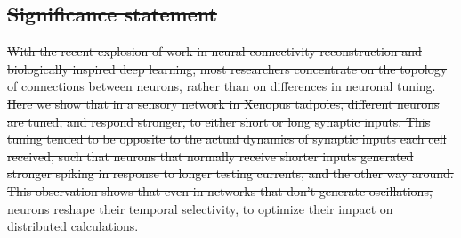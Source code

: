 \documentclass{article}
\providecommand{\DIFdeltex}[1]{{\protect\color{red}\sout{#1}}}                      %
\providecommand{\DIFaddbegin}{} %
\providecommand{\DIFaddend}{} %
\providecommand{\DIFdelbegin}{} %
\providecommand{\DIFdelend}{} %
\providecommand{\DIFdel}[1]{\texorpdfstring{\DIFdeltex{#1}}{}} %
\newcommand{\DIFscaledelfig}{0.5}
\newlength{\DIFdelgraphicswidth} %
\newlength{\DIFdelgraphicsheight} %
\newcommand{\DIFaddincludegraphics}[2][]{{\color{blue}\fbox{\DIFOincludegraphics[#1]{#2}}}} %
\newcommand{\DIFdelincludegraphics}[2][]{%
\sbox{\DIFdelgraphicsbox}{\DIFOincludegraphics[#1]{#2}}%
\settoboxwidth{\DIFdelgraphicswidth}{\DIFdelgraphicsbox} %
\settoboxtotalheight{\DIFdelgraphicsheight}{\DIFdelgraphicsbox} %
\scalebox{\DIFscaledelfig}{%
\parbox[b]{\DIFdelgraphicswidth}{\usebox{\DIFdelgraphicsbox}\\[-\baselineskip] \rule{\DIFdelgraphicswidth}{0em}}\llap{\resizebox{\DIFdelgraphicswidth}{\DIFdelgraphicsheight}{%
\setlength{\unitlength}{\DIFdelgraphicswidth}%
\begin{picture}(1,1)%
\thicklines\linethickness{2pt} %
{\color[rgb]{1,0,0}\put(0,0){\framebox(1,1){}}}%
{\color[rgb]{1,0,0}\put(0,0){\line( 1,1){1}}}%
{\color[rgb]{1,0,0}\put(0,1){\line(1,-1){1}}}%
\end{picture}%
}\hspace*{3pt}}} %
} %
\DeclareRobustCommand{\DIFaddbegin}{\DIFOaddbegin \let\includegraphics\DIFaddincludegraphics} %
\DeclareRobustCommand{\DIFaddend}{\DIFOaddend \let\includegraphics\DIFOincludegraphics} %
\DeclareRobustCommand{\DIFdelbegin}{\DIFOdelbegin \let\includegraphics\DIFdelincludegraphics} %
\DeclareRobustCommand{\DIFdelend}{\DIFOaddend \let\includegraphics\DIFOincludegraphics} %
\begin{document}
\begin{flushleft}
\DIFaddbegin 

\DIFaddend %


\DIFdelbegin \section*{\DIFdel{Significance statement}}
\DIFdel{With the recent explosion of work in neural connectivity reconstruction and biologically inspired deep learning, most researchers concentrate on the topology of connections between neurons, rather than on differences in neuronal tuning. Here we show that in a sensory network in Xenopus tadpoles, different neurons are tuned, and respond stronger, to either short or long synaptic inputs. This tuning tended to be opposite to the actual dynamics of synaptic inputs each cell received, such that neurons that normally receive shorter inputs generated stronger spiking in response to longer testing currents, and the other way around. This observation shows that even in networks that don't generate oscillations, neurons reshape their temporal selectivity, to optimize their impact on distributed calculations. 
}\DIFdelend \bigskip

\end{flushleft} %
\end{document}
